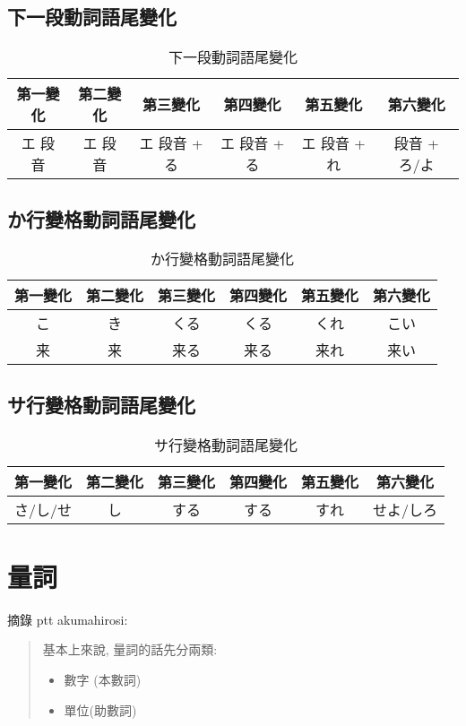 \documentclass[12pt]{article}
\begin{document}
\begin{CJK}{UTF8}{cybercjk}
\subsection{下一段動詞語尾變化}
\begin{table}[htdp]
{\scriptsize
\begin{tabular}{cccccc}
\hline
第一變化 & 第二變化 & 第三變化 & 第四變化 & 第五變化 & 第六變化 \\
\hline
エ 段音 & エ 段音 & エ 段音 + る &  エ 段音 + る &  エ 段音 + れ &  段音 + ろ/よ \\
\hline
\end{tabular}
\caption{下一段動詞語尾變化}
}
\end{table}

\subsection{か行變格動詞語尾變化}
\begin{table}[htdp]
{\scriptsize
\begin{tabular}{cccccc}
\hline
第一變化 & 第二變化 & 第三變化 & 第四變化 & 第五變化 & 第六變化 \\
\hline
こ & き & くる & くる & くれ& こい \\
来 & 来 & 来る & 来る & 来れ& 来い \\
\hline
\end{tabular}
\caption{か行變格動詞語尾變化}
}
\end{table}

\subsection{サ行變格動詞語尾變化}
\begin{table}[htdp]
\begin{tabular}{cccccc}
\hline
第一變化 & 第二變化 & 第三變化 & 第四變化 & 第五變化 & 第六變化 \\
\hline
さ/し/せ & し & する & する & すれ& せよ/しろ \\
\hline
\end{tabular}
\caption{サ行變格動詞語尾變化}
\end{table}

\section{量詞}

摘錄 ptt akumahirosi:
\begin{quote}
  基本上來說, 量詞的話先分兩類:
  \begin{itemize}
  \item 數字 (本數詞)
  \item 單位(助數詞)
  \end{itemize}


\end{quote}
\end{CJK}
\end{document}

